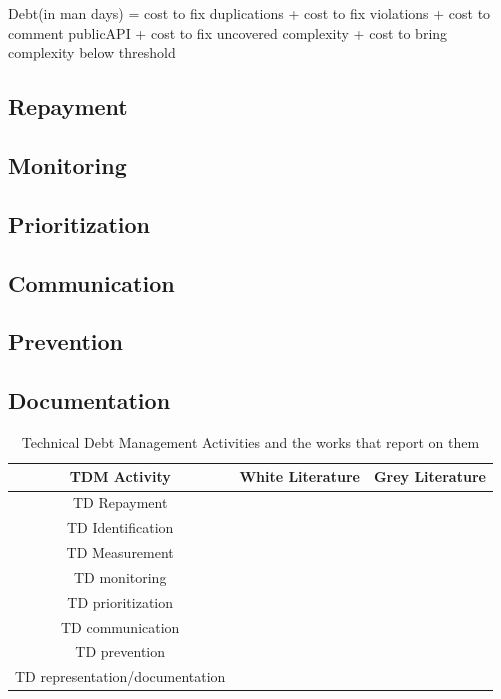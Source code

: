 Debt(in man days) = cost to fix duplications + cost to fix violations + cost to comment publicAPI + cost to fix uncovered complexity + cost to bring complexity below threshold

\subsection{Repayment}

\subsection{Monitoring}
\subsection{Prioritization}
\subsection{Communication}
\subsection{Prevention}
\subsection{Documentation}

\begin{table}[h!]
    
\centering
\begin{tabular}{|c|c|c|}
    \hline
    TDM Activity & White Literature & Grey Literature \\ \hline
    TD Repayment &~\cite{10.1145/3084226.3084248, 10.1145/3387906.3388623} &  \\ \hline
    TD Identification &~\cite{Klotins2018/3183519.3183539, CicoTradeoffs} & \\ \hline
    TD Measurement & &~\cite{Qualityv77:online, Whopayso60:online}\\ \hline
    TD monitoring &~\cite{Besker2018} & \\ \hline
 TD prioritization & ~\cite{9820390} &~\cite{techolut25:online, HowtoGet43:online}\\ \hline
TD communication & &~\cite{FowlerBottlenecks} \\ \hline
TD prevention &~\cite{SanchezGordon2016} &~\cite{Creating18:online}\\ \hline
TD representation/documentation &~\cite{Chicote:2017} & \\ \hline
    \end{tabular}

\caption{Technical Debt Management Activities and the works that report on them}
  \label{tab:TDMactivities}
\end{table}

